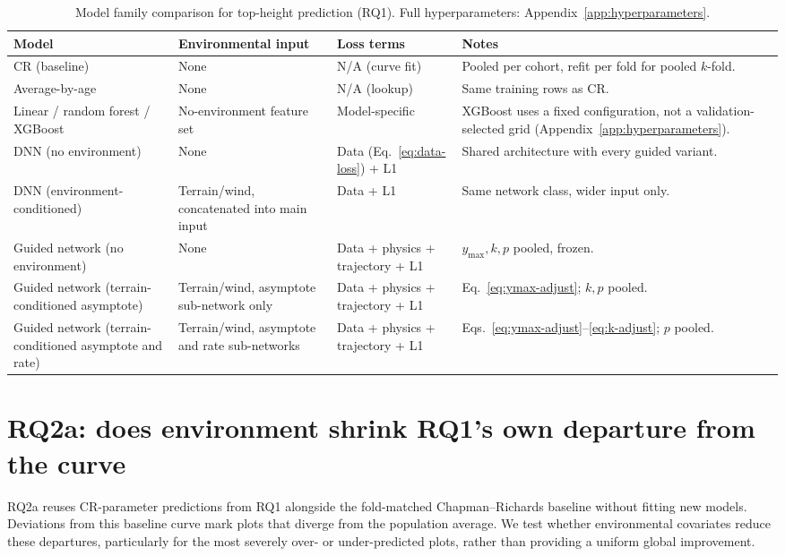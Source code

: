 \documentclass[11pt,a4paper]{report}
\begin{document}
\begin{table}[!htbp]
\scriptsize
\renewcommand{\arraystretch}{1.2}
\begin{tabular}{p{3.2cm}p{3cm}p{2.6cm}p{4.5cm}}
\toprule
Model & Environmental input & Loss terms & Notes \\
\midrule
CR (baseline) & None & N/A (curve fit) & Pooled per cohort, refit per fold for pooled $k$-fold. \\
Average-by-age & None & N/A (lookup) & Same training rows as CR. \\
Linear / random forest / XGBoost & No-environment feature set & Model-specific & XGBoost uses a
fixed configuration, not a validation-selected grid (Appendix~\ref{app:hyperparameters}). \\
DNN (no environment) & None & Data (Eq.~\ref{eq:data-loss}) + L1 & Shared architecture with every
guided variant. \\
DNN (environment-conditioned) & Terrain/wind, concatenated into main input & Data + L1 & Same
network class, wider input only. \\
Guided network (no environment) & None & Data + physics + trajectory + L1 & $y_{\max},k,p$
pooled, frozen. \\
Guided network (terrain-conditioned asymptote) & Terrain/wind, asymptote sub-network only & Data +
physics + trajectory + L1 & Eq.~\ref{eq:ymax-adjust}; $k,p$ pooled. \\
Guided network (terrain-conditioned asymptote and rate) & Terrain/wind, asymptote and rate
sub-networks & Data + physics + trajectory + L1 & Eqs.~\ref{eq:ymax-adjust}--\ref{eq:k-adjust};
$p$ pooled. \\
\bottomrule
\end{tabular}
\caption{Model family comparison for top-height prediction (RQ1). Full hyperparameters:
Appendix~\ref{app:hyperparameters}.}
\label{tab:rq1-models}
\end{table}


\section{RQ2a: does environment shrink RQ1's own departure from the curve}
RQ2a reuses CR-parameter predictions from RQ1 alongside the fold-matched Chapman--Richards baseline without fitting new models. Deviations from this baseline curve mark plots that diverge from the population average. We test whether environmental covariates reduce these departures, particularly for the most severely over- or under-predicted plots, rather than providing a uniform global improvement.
\end{document}
